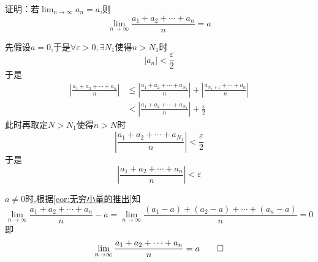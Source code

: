 \begin{brown}
    \begin{example}
        证明：若$\displaystyle \lim_{n\to\infty}a_n=a$,则\[
        \lim_{n\to\infty}\frac{a_1+a_2+\cdots+a_n}{n}=a
        \]
    \end{example}
    \begin{Proof}
        先假设$a=0$,于是$\forall \varepsilon>0,\exists N_1$使得$n>N_1$时\[
        \left|a_n\right|<\frac{\varepsilon}{2}
        \]于是\begin{align*}
            \left|\frac{
            a_1+a_2+\cdots+a_n
            }{n}\right|&\leqslant\left|\frac{
                a_1+a_2+\cdots+a_{N_1}
            }{n}\right|+\left|\frac{
                a_{N_1+1}+\cdots+a_n
            }{n}\right|\\
            &<\left|
                \frac{
                    a_1+a_2+\cdots+a_{N_1}
                }{n}
            \right|+\frac{\varepsilon}{2}
        \end{align*}此时再取定$N>N_1$使得$n>N$时\[
        \left|
            \frac{
                a_1+a_2+\cdots+a_{N_1}
            }{n}
        \right|<\frac{\varepsilon}{2}
        \]于是\[
        \left|
            \frac{
                a_1+a_2+\cdots+a_n
            }{n}
        \right|<\varepsilon
        \]

        $a\neq 0$时,根据\cref{cor:无穷小量的推出}知\[
        \lim_{n\to\infty}\frac{a_1+a_2+\cdots+a_n}{n}-a=\lim_{n\to\infty}\frac{\left(a_1-a\right)+\left(a_2-a\right)+\cdots+\left(a_n-a\right)}{n}=0
        \]即\[
        \lim_{n\to\infty}\frac{a_1+a_2+\cdots+a_n}{n}=a\qedhere
        \]
    \end{Proof}
\end{brown}
